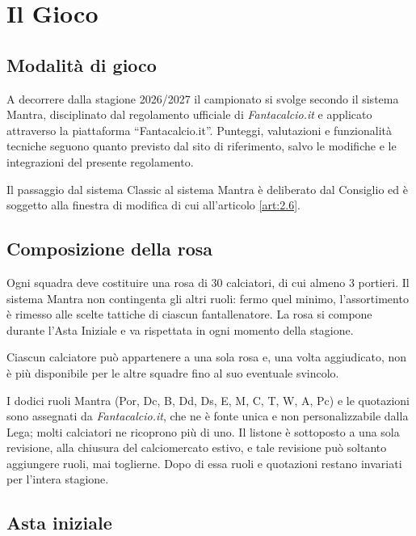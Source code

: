 \chapter{Il Gioco}
\label{cap:il-gioco}

\section{Modalità di gioco}
\label{art:4.1}

A decorrere dalla stagione 2026/2027 il campionato si svolge secondo il sistema Mantra, disciplinato dal regolamento ufficiale di \emph{Fantacalcio.it} e applicato attraverso la piattaforma “Fantacalcio.it”. Punteggi, valutazioni e funzionalità tecniche seguono quanto previsto dal sito di riferimento, salvo le modifiche e le integrazioni del presente regolamento.

Il passaggio dal sistema Classic al sistema Mantra è deliberato dal Consiglio ed è soggetto alla finestra di modifica di cui all'articolo \ref{art:2.6}.

\section{Composizione della rosa}
\label{art:4.2}

Ogni squadra deve costituire una rosa di 30 calciatori, di cui almeno 3 portieri. Il sistema Mantra non contingenta gli altri ruoli: fermo quel minimo, l'assortimento è rimesso alle scelte tattiche di ciascun fantallenatore. La rosa si compone durante l'Asta Iniziale e va rispettata in ogni momento della stagione.

Ciascun calciatore può appartenere a una sola rosa e, una volta aggiudicato, non è più disponibile per le altre squadre fino al suo eventuale svincolo.

I dodici ruoli Mantra (Por, Dc, B, Dd, Ds, E, M, C, T, W, A, Pc) e le quotazioni sono assegnati da \emph{Fantacalcio.it}, che ne è fonte unica e non personalizzabile dalla Lega; molti calciatori ne ricoprono più di uno. Il listone è sottoposto a una sola revisione, alla chiusura del calciomercato estivo, e tale revisione può soltanto aggiungere ruoli, mai toglierne. Dopo di essa ruoli e quotazioni restano invariati per l'intera stagione.

\section{Asta iniziale}
\label{art:4.3}

